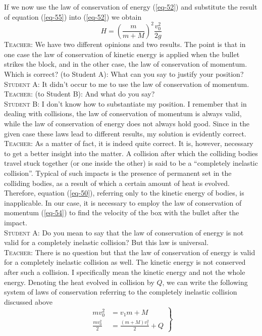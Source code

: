 \documentclass[a4paper,sfsidenotes]{tufte-book}
\begin{document}
If we now use the law of conservation of energy (\ref{eq-52}) and substitute the result of equation (\ref{eq-55}) into (\ref{eq-52}) we obtain
\\
\begin{equation}
H = \left(\frac{m}{m + M} \right)^{2}	\frac{v_{0}^{2}}{2g}
\label{eq-56}
\end{equation}
\textsc{Teacher:} We have two different opinions and two results. The point is that in one case the law of conservation of kinetic energy is applied when the bullet strikes the block, and in the other case, the law of conservation of momentum. Which is correct? (to Student A): What can you say to justify your
position?
\\
\textsc{Student A:} It didn't occur to me to use the law of conservation of momentum.
\\
\textsc{Teacher:} (to Student B): And what do you say?
\\
\textsc{Student B:} I don't know how to substantiate my position. I remember that in dealing with collisions, the law of conservation of momentum is always valid, while the law of conservation of energy does not always hold good. Since in the given case these laws lead to different results, my solution is evidently correct.
\\
\textsc{Teacher:} As a matter of fact, it is indeed quite correct. It is, however, necessary to get a better insight into the matter. A collision after which the colliding bodies travel stuck together (or one inside the other) is said to be a ``completely inelastic collision''. Typical of such impacts is the presence of permanent set in the colliding bodies, as a result of which a certain amount of heat is evolved. Therefore, equation (\ref{eq-50}), referring only to the kinetic energy of bodies, is inapplicable. In our case, it is necessary to employ the law of conservation of momentum (\ref{eq-54}) to find the velocity of the box with the bullet after the impact.
\\
\textsc{Student A:} Do you mean to say that the law of conservation of energy is not valid for a completely inelastic collision? But this law is universal.
\\
\textsc{Teacher:} There is no question but that the law of conservation of energy is valid for a completely inelastic collision as well. The kinetic energy is not conserved after such a collision. I specifically mean the kinetic energy and not the whole energy. Denoting the heat evolved in collision by $Q$, we can write the following system of laws of conservation referring to the completely inelastic collision discussed above \\
\begin{equation} 
\left.
\begin{split}
mv_{0}^{2}  & = v_{1} {m + M}\\
\frac{mv_{0}^{2}}{2} & = \frac{(m+M) v_{1}^{2}}{2} + Q
\label{eq-57}
\end{split}
\right\}
\end{equation}
\end{document}
